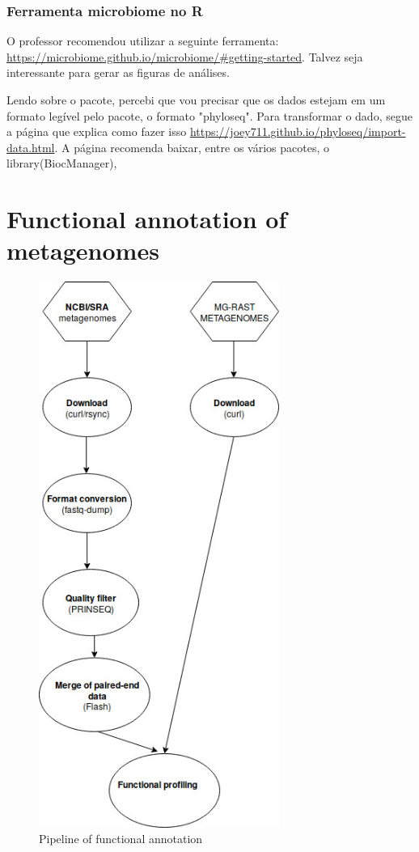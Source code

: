 \documentclass[12pt, a4paper]{report}
\begin{document}
\subsection{Ferramenta microbiome no R}
O professor recomendou utilizar a seguinte ferramenta: \url{https://microbiome.github.io/microbiome/#getting-started}. Talvez seja interessante para gerar as figuras de análises.

Lendo sobre o pacote, percebi que vou precisar que os dados estejam em um formato legível pelo pacote, o formato "phyloseq". Para transformar o dado, segue a página que explica como fazer isso \url{https://joey711.github.io/phyloseq/import-data.html}.
A página recomenda baixar, entre os vários pacotes, o library(BiocManager), 

\newpage
\chapter{Functional annotation of metagenomes}
\begin{figure}
  \centering 
  \includegraphics[width=0.7\textwidth]{figures/pipeline_functional.jpg}
  \caption{Pipeline of functional annotation}
  \end{figure}
\end{document}
